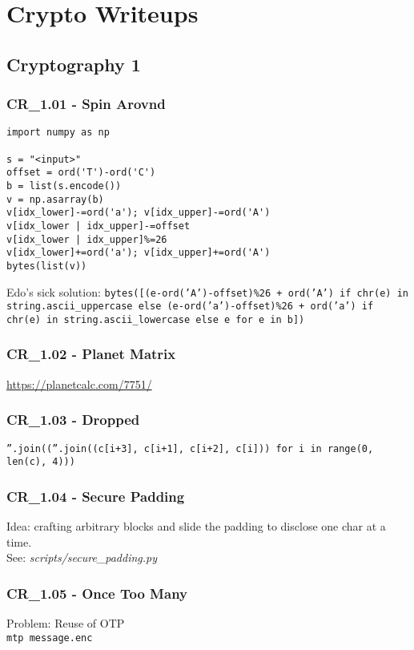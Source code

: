 \chapter{Crypto Writeups}


\section{Cryptography 1}
\subsection{CR_1.01 - Spin Arovnd}
\begin{verbatim}
import numpy as np

s = "<input>"
offset = ord('T')-ord('C')
b = list(s.encode())
v = np.asarray(b)
v[idx_lower]-=ord('a'); v[idx_upper]-=ord('A')
v[idx_lower | idx_upper]-=offset
v[idx_lower | idx_upper]%=26
v[idx_lower]+=ord('a'); v[idx_upper]+=ord('A')
bytes(list(v))
\end{verbatim} 

Edo's sick solution: \texttt{bytes([(e-ord('A')-offset)\%26 + ord('A') if chr(e) in string.ascii_uppercase else (e-ord('a')-offset)\%26 + ord('a') if chr(e) in string.ascii_lowercase else e for e in b])}

\subsection{CR_1.02 - Planet Matrix}
\url{https://planetcalc.com/7751/}

\subsection{CR_1.03 - Dropped}
\texttt{''.join((''.join((c[i+3], c[i+1], c[i+2], c[i])) for i in range(0, len(c), 4)))}

\subsection{CR_1.04 - Secure Padding}
Idea: crafting arbitrary blocks and slide the padding to disclose one char at a time. \\
See: \textit{scripts/secure_padding.py}

\subsection{CR_1.05 - Once Too Many}
Problem: Reuse of OTP \\
\texttt{mtp message.enc}

